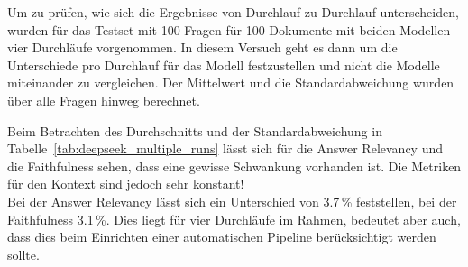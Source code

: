 Um zu prüfen, wie sich die Ergebnisse von Durchlauf zu Durchlauf unterscheiden, wurden für das Testset mit 100 Fragen für 100 Dokumente mit beiden Modellen vier Durchläufe vorgenommen.
In diesem Versuch geht es dann um die Unterschiede pro Durchlauf für das Modell festzustellen und nicht die Modelle miteinander zu vergleichen.
Der Mittelwert und die Standardabweichung wurden über alle Fragen hinweg berechnet.

%


\begin{table}[h!]
    \centering
    \caption[DeepSeek Abweichungen mehrere Durchläufe]{Durchschnittswerte und Standardabweichungen der Metriken über vier Durchläufe für DeepSeek}
    \label{tab:deepseek_multiple_runs}
\end{table}

Beim Betrachten des Durchschnitts und der Standardabweichung in Tabelle~\ref{tab:deepseek_multiple_runs} lässt sich für die Answer Relevancy und die Faithfulness sehen, dass eine gewisse Schwankung vorhanden ist.
Die Metriken für den Kontext sind jedoch sehr konstant!\\
Bei der Answer Relevancy lässt sich ein Unterschied von 3.7\,\% feststellen, bei der Faithfulness 3.1\,\%.
Dies liegt für vier Durchläufe im Rahmen, bedeutet aber auch, dass dies beim Einrichten einer automatischen Pipeline berücksichtigt werden sollte.

